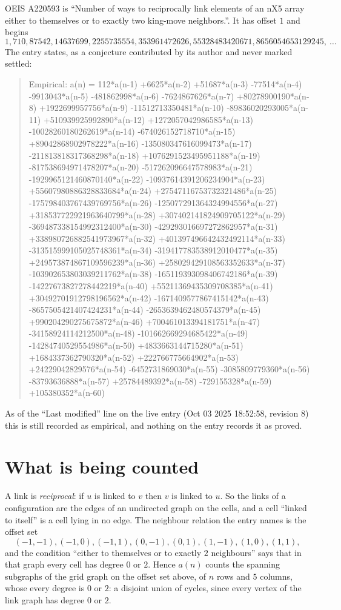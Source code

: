 \documentclass[11pt,a4paper]{article}
\theoremstyle{plain}
\theoremstyle{definition}
\begin{document}
OEIS A220593 is ``Number of ways to reciprocally link elements of an nX5 array either to themselves or to exactly two king-move neighbors.''. It has offset $1$ and begins
\[
1, 710, 87542, 14637699, 2255735554, 353961472626, 55328483420671, 8656054653129245,\ \dots
\]
The entry states, as a conjecture contributed by its author and never marked settled:
\begin{quote}
Empirical: a(n) = 112*a(n-1) +6625*a(n-2) +51687*a(n-3) -77514*a(n-4) -9913043*a(n-5) -481862998*a(n-6) -7624867626*a(n-7) +80278900190*a(n-8) +1922699957756*a(n-9) -11512713350481*a(n-10) -89836020293005*a(n-11) +510939925992890*a(n-12) +1272057042986585*a(n-13) -10028260180262619*a(n-14) -674026152718710*a(n-15) +89042868902978222*a(n-16) -135080347616099473*a(n-17) -211813818317368298*a(n-18) +1076291523495951188*a(n-19) -817538694971478207*a(n-20) -517262096647578983*a(n-21) -1929965121460870140*a(n-22) -10937614391206234904*a(n-23) +55607980886328833684*a(n-24) +27547116753732321486*a(n-25) -175798403767439769756*a(n-26) -125077291364324994556*a(n-27) +318537722921963640799*a(n-28) +307402141824909705122*a(n-29) -369487338154992312400*a(n-30) -429293016697272862957*a(n-31) +338980726882541973967*a(n-32) +401397496642432492114*a(n-33) -313515999105025748361*a(n-34) -319417783538912010477*a(n-35) +249573874867109596239*a(n-36) +258029429108563352633*a(n-37) -103902653803039211762*a(n-38) -165119393098406742186*a(n-39) -14227673827278442219*a(n-40) +55211369435309708385*a(n-41) +30492701912798196562*a(n-42) -1671409577867415142*a(n-43) -8657505421407424231*a(n-44) -2653639462480574379*a(n-45) +990204290275675872*a(n-46) +700461013394181751*a(n-47) -34158924114212500*a(n-48) -101662669294685422*a(n-49) -14284740529554986*a(n-50) +4833663144715280*a(n-51) +1684337362790320*a(n-52) +222766775664902*a(n-53) +24229042829576*a(n-54) -6452731869030*a(n-55) -3085809779360*a(n-56) -83793636888*a(n-57) +25784489392*a(n-58) -729155328*a(n-59) +105380352*a(n-60)
\end{quote}
As of the ``Last modified'' line on the live entry (Oct 03 2025 18:52:58, revision 8) this is still
recorded as empirical, and nothing on the entry records it as proved.

\section{What is being counted}

A link is \emph{reciprocal}: if $u$ is linked to $v$ then $v$ is linked to $u$. So the links
of a configuration are the edges of an undirected graph on the cells, and a cell ``linked to
itself'' is a cell lying in no edge. The neighbour relation the entry names is the offset set
\[
(-1,-1), (-1,0), (-1,1), (0,-1), (0,1), (1,-1), (1,0), (1,1),
\]
and the condition ``either to themselves or to exactly $2$ neighbours'' says that in that
graph every cell has degree $0$ or $2$. Hence $a(n)$ counts the spanning subgraphs of the
grid graph on the offset set above, of $n$ rows and $5$ columns,
whose every degree is $0$ or $2$: a disjoint union of cycles, since every vertex of the link graph has degree $0$ or $2$.
\end{document}
